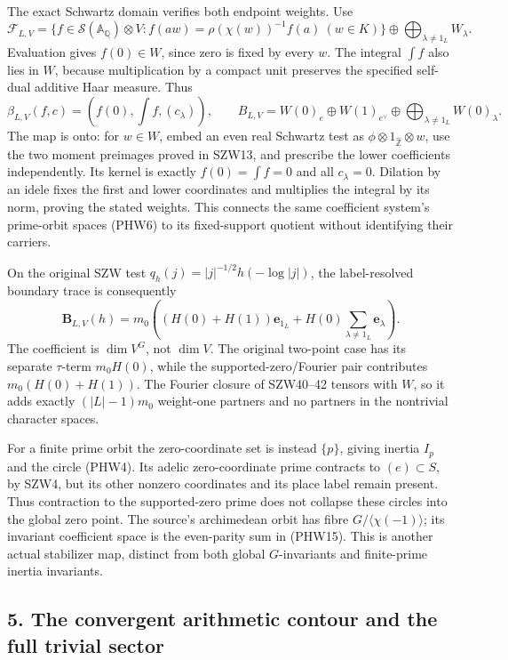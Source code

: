 \documentclass[
  10pt,
  a4paper,
]{article}
\begin{document}
The exact Schwartz domain verifies both endpoint weights. Use \[
\mathcal F_{L,V}=
\{f\in\mathcal S(\mathbb A_{\mathbb Q})\otimes V:
f(aw)=\rho(\chi(w))^{-1}f(a)\ (w\in K)\}
\oplus\bigoplus_{\lambda\ne1_L}W_\lambda.
\tag{PHW20}
\] Evaluation gives \(f(0)\in W\), since zero is fixed by every \(w\).
The integral \(\int f\) also lies in \(W\), because multiplication by a
compact unit preserves the specified self-dual additive Haar measure.
Thus \[
\beta_{L,V}(f,c)=\left(f(0),\int f,(c_\lambda)\right),
\qquad
B_{L,V}=W(0)_e\oplus W(1)_{e^\vee}
\oplus\bigoplus_{\lambda\ne1_L}W(0)_\lambda.
\tag{PHW21}
\] The map is onto: for \(w\in W\), embed an even real Schwartz test as
\(\phi\otimes1_{\widehat{\mathbb Z}}\otimes w\), use the two moment
preimages proved in SZW13, and prescribe the lower coefficients
independently. Its kernel is exactly \(f(0)=\int f=0\) and all
\(c_\lambda=0\). Dilation by an idele fixes the first and lower
coordinates and multiplies the integral by its norm, proving the stated
weights. This connects the same coefficient system's prime-orbit spaces
(PHW6) to its fixed-support quotient without identifying their carriers.

On the original SZW test \(q_h(j)=|j|^{-1/2}h(-\log|j|)\), the
label-resolved boundary trace is consequently \[
\boldsymbol B_{L,V}(h)
=m_0\left((H(0)+H(1))\mathbf e_{1_L}
+H(0)\sum_{\lambda\ne1_L}\mathbf e_\lambda\right).
\tag{PHW22}
\] The coefficient is \(\dim V^G\), not \(\dim V\). The original
two-point case has its separate \(\tau\)-term \(m_0H(0)\), while the
supported-zero/Fourier pair contributes \(m_0(H(0)+H(1))\). The Fourier
closure of SZW40--42 tensors with \(W\), so it adds exactly
\((|L|-1)m_0\) weight-one partners and no partners in the nontrivial
character spaces.

For a finite prime orbit the zero-coordinate set is instead \(\{p\}\),
giving inertia \(I_p\) and the circle (PHW4). Its adelic zero-coordinate
prime contracts to \((e)\subset S\), by SZW4, but its other nonzero
coordinates and its place label remain present. Thus contraction to the
supported-zero prime does not collapse these circles into the global
zero point. The source's archimedean orbit has fibre
\(G/\langle\chi(-1)\rangle\); its invariant coefficient space is the
even-parity sum in (PHW15). This is another actual stabilizer map,
distinct from both global \(G\)-invariants and finite-prime inertia
invariants.

\subsection{5. The convergent arithmetic contour and the full trivial
sector}\label{the-convergent-arithmetic-contour-and-the-full-trivial-sector}
\end{document}
